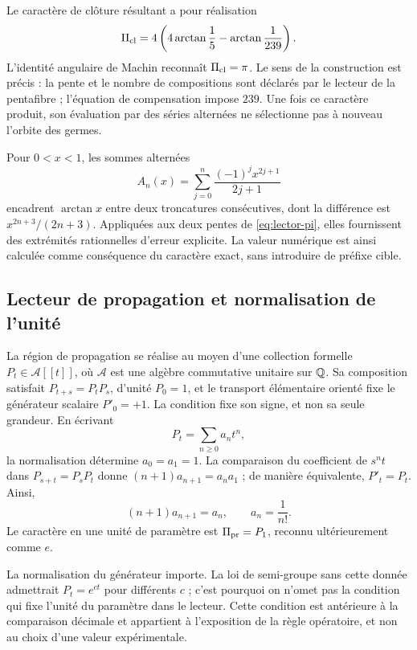Le caractère de clôture résultant a pour réalisation
\begin{equation}
 \Pi_{\rm cl}=4\left(4\arctan\frac15-\arctan\frac1{239}\right).
 \label{eq:lector-pi}
\end{equation}
L'identité angulaire de Machin reconnaît \(\Pi_{\rm cl}=\pi\). Le sens de la construction est précis : la pente et le nombre de compositions sont déclarés par le lecteur de la pentafibre ; l'équation de compensation impose \(239\). Une fois ce caractère produit, son évaluation par des séries alternées ne sélectionne pas à nouveau l'orbite des germes.

Pour \(0<x<1\), les sommes alternées
\[
 A_n(x)=\sum_{j=0}^n\frac{(-1)^jx^{2j+1}}{2j+1}
\]
encadrent \(\arctan x\) entre deux troncatures consécutives, dont la différence est \(x^{2n+3}/(2n+3)\). Appliquées aux deux pentes de \eqref{eq:lector-pi}, elles fournissent des extrémités rationnelles d'erreur explicite. La valeur numérique est ainsi calculée comme conséquence du caractère exact, sans introduire de préfixe cible.

\subsection{Lecteur de propagation et normalisation de l'unité}

La région de propagation se réalise au moyen d'une collection formelle \(P_t\in\mathcal A[[t]]\), où \(\mathcal A\) est une algèbre commutative unitaire sur \(\mathbb Q\). Sa composition satisfait \(P_{t+s}=P_tP_s\), d'unité \(P_0=1\), et le transport élémentaire orienté fixe le générateur scalaire \(P'_0=+1\). La condition fixe son signe, et non sa seule grandeur. En écrivant
\[
 P_t=\sum_{n\ge0}a_nt^n,
\]
la normalisation détermine \(a_0=a_1=1\). La comparaison du coefficient de \(s^nt\) dans \(P_{s+t}=P_sP_t\) donne \((n+1)a_{n+1}=a_na_1\) ; de manière équivalente, \(P'_t=P_t\). Ainsi,
\begin{equation}
 (n+1)a_{n+1}=a_n,\qquad a_n=\frac1{n!}.
 \label{eq:propagacion}
\end{equation}
Le caractère en une unité de paramètre est \(\Pi_{\rm pr}=P_1\), reconnu ultérieurement comme \(e\).

La normalisation du générateur importe. La loi de semi-groupe sans cette donnée admettrait \(P_t=e^{ct}\) pour différents \(c\) ; c'est pourquoi on n'omet pas la condition qui fixe l'unité du paramètre dans le lecteur. Cette condition est antérieure à la comparaison décimale et appartient à l'exposition de la règle opératoire, et non au choix d'une valeur expérimentale.

